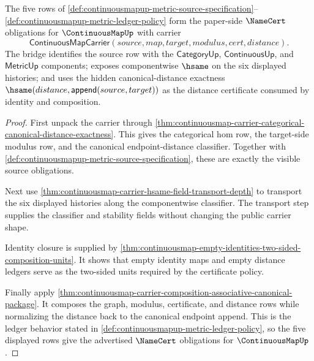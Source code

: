 \begin{theorem}
\label{thm:continuousmapup-metric-certificate-bridge}
The five rows of
\autoref{def:continuousmapup-metric-source-specification}--\autoref{def:continuousmapup-metric-ledger-policy}
form the paper-side $\NameCert$ obligations for $\ContinuousMapUp$ with carrier
$$
\mathsf{ContinuousMapCarrier}(source,map,target,modulus,cert,distance).
$$
The bridge identifies the source row with the
$\mathsf{CategoryUp}$, $\mathsf{ContinuousUp}$, and $\mathsf{MetricUp}$
components; exposes componentwise $\hsame$ on the six displayed histories; and
uses the hidden canonical-distance exactness
$\hsame(distance,\mathsf{append}(source,target))$ as the distance certificate
consumed by identity and composition.
\end{theorem}
\begin{proof}
First unpack the carrier through
\autoref{thm:continuousmap-carrier-categorical-canonical-distance-exactness}.
This gives the categorical hom row, the target-side modulus row, and the
canonical endpoint-distance classifier. Together with
\autoref{def:continuousmapup-metric-source-specification}, these are exactly
the visible source obligations.

Next use
\autoref{thm:continuousmap-carrier-hsame-field-transport-depth} to transport
the six displayed histories along the componentwise classifier. The transport
step supplies the classifier and stability fields without changing the public
carrier shape.

Identity closure is supplied by
\autoref{thm:continuousmap-empty-identities-two-sided-composition-units}. It
shows that empty identity maps and empty distance ledgers serve as the
two-sided units required by the certificate policy.

Finally apply
\autoref{thm:continuousmap-carrier-composition-associative-canonical-package}.
It composes the graph, modulus, certificate, and distance rows while
normalizing the distance back to the canonical endpoint append. This is the
ledger behavior stated in
\autoref{def:continuousmapup-metric-ledger-policy}, so the five displayed rows
give the advertised $\NameCert$ obligations for $\ContinuousMapUp$.
\end{proof}



